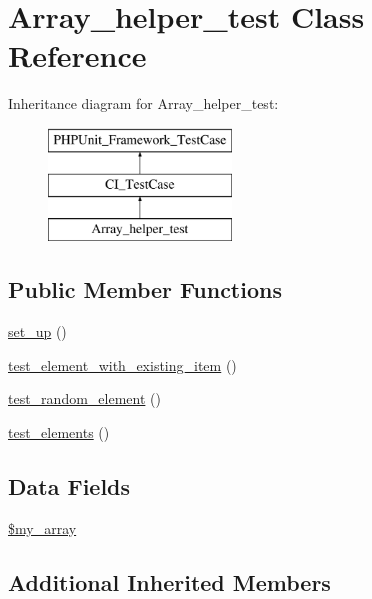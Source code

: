 \hypertarget{class_array__helper__test}{}\section{Array\+\_\+helper\+\_\+test Class Reference}
\label{class_array__helper__test}
Inheritance diagram for Array\+\_\+helper\+\_\+test\+:\begin{figure}[H]
\begin{center}
\leavevmode
\includegraphics[height=3.000000cm]{class_array__helper__test}
\end{center}
\end{figure}
\subsection*{Public Member Functions}
\begin{DoxyCompactItemize}
\item 
\hyperlink{class_array__helper__test_a69829875c8d4b6ce94908445c4155741}{set\+\_\+up} ()
\item 
\hyperlink{class_array__helper__test_af33d33598c3f4d5fd4c2d52fd725ca6a}{test\+\_\+element\+\_\+with\+\_\+existing\+\_\+item} ()
\item 
\hyperlink{class_array__helper__test_a94dbb9872f3ae0a9dd95ced6cd41c25a}{test\+\_\+random\+\_\+element} ()
\item 
\hyperlink{class_array__helper__test_a96834048e067eabf3dbf9680b285bfa4}{test\+\_\+elements} ()
\end{DoxyCompactItemize}
\subsection*{Data Fields}
\begin{DoxyCompactItemize}
\item 
\hyperlink{class_array__helper__test_afb14849b6d5ca8632071134e123af8d9}{\$my\+\_\+array}
\end{DoxyCompactItemize}
\subsection*{Additional Inherited Members}



